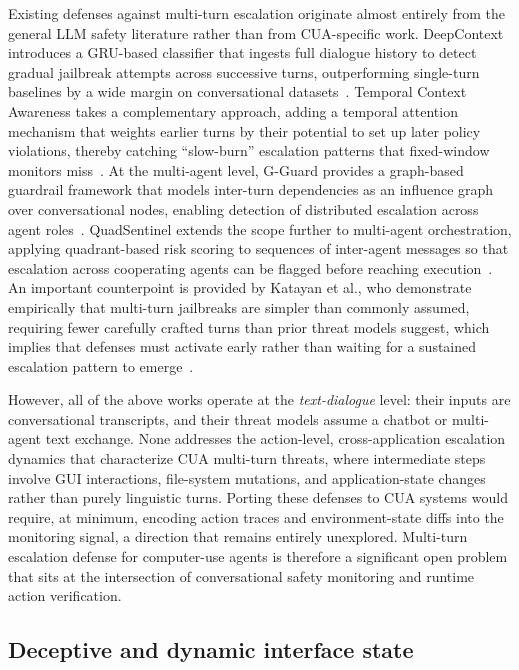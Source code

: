 Existing defenses against multi-turn escalation originate almost entirely from the general LLM safety literature rather than from CUA-specific work. DeepContext introduces a GRU-based classifier that ingests full dialogue history to detect gradual jailbreak attempts across successive turns, outperforming single-turn baselines by a wide margin on conversational datasets~\cite{deepcontext2025}. Temporal Context Awareness takes a complementary approach, adding a temporal attention mechanism that weights earlier turns by their potential to set up later policy violations, thereby catching ``slow-burn'' escalation patterns that fixed-window monitors miss~\cite{temporalcontext2025}. At the multi-agent level, G-Guard provides a graph-based guardrail framework that models inter-turn dependencies as an influence graph over conversational nodes, enabling detection of distributed escalation across agent roles~\cite{gguard2025}. QuadSentinel extends the scope further to multi-agent orchestration, applying quadrant-based risk scoring to sequences of inter-agent messages so that escalation across cooperating agents can be flagged before reaching execution~\cite{quadsentinel2025}. An important counterpoint is provided by Katayan et al., who demonstrate empirically that multi-turn jailbreaks are simpler than commonly assumed, requiring fewer carefully crafted turns than prior threat models suggest, which implies that defenses must activate early rather than waiting for a sustained escalation pattern to emerge~\cite{multiturnSimpler2025}.

However, all of the above works operate at the \emph{text-dialogue} level: their inputs are conversational transcripts, and their threat models assume a chatbot or multi-agent text exchange. None addresses the action-level, cross-application escalation dynamics that characterize CUA multi-turn threats, where intermediate steps involve GUI interactions, file-system mutations, and application-state changes rather than purely linguistic turns. Porting these defenses to CUA systems would require, at minimum, encoding action traces and environment-state diffs into the monitoring signal, a direction that remains entirely unexplored. Multi-turn escalation defense for computer-use agents is therefore a significant open problem that sits at the intersection of conversational safety monitoring and runtime action verification.

\subsection{Deceptive and dynamic interface state}

